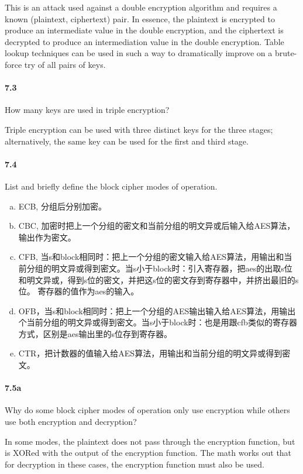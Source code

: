 \documentclass[UTF8]{article}
\begin{document}
This is an attack used against a double encryption algorithm and requires a known (plaintext, ciphertext) pair. In essence, the plaintext is encrypted to produce an intermediate value in the double encryption, and the ciphertext is decrypted to produce an intermediation value in the double encryption. Table lookup techniques can be used in such a way to dramatically improve on a brute-force try of all pairs of keys.

\paragraph{7.3}
How many keys are used in triple encryption?

Triple encryption can be used with three distinct keys for the three stages; alternatively, the same key can be used for the first and third stage.
\paragraph{7.4}
List and briefly define the block cipher modes of operation.

\begin{enumerate}[(a)]
    \item ECB, 分组后分别加密。
    \item CBC, 加密时把上一个分组的密文和当前分组的明文异或后输入给AES算法，输出作为密文。
    \item CFB, 当s和block相同时：把上一个分组的密文输入给AES算法，用输出和当前分组的明文异或得到密文。当s小于block时：引入寄存器，把aes的出取s位和明文异或，得到s位的密文，并把这s位的密文存到寄存器中，并挤出最旧的s位。 寄存器的值作为aes的输入。
    \item OFB，当s和block相同时：把上一个分组的AES输出输入给AES算法，用输出个当前分组的明文异或得到密文。当s小于block时：也是用跟cfb类似的寄存器方式，区别是aes输出里的s位存到寄存器。
    \item CTR，把计数器的值输入给AES算法，用输出和当前分组的明文异或得到密文。
\end{enumerate}
\paragraph{7.5a}
Why do some block cipher modes of operation only use encryption while others use both encryption and decryption?

In some modes, the plaintext does not pass through the encryption function, but is XORed with the output of the encryption function. The math works out that for decryption in these cases, the encryption function must also be used.
\end{document}
